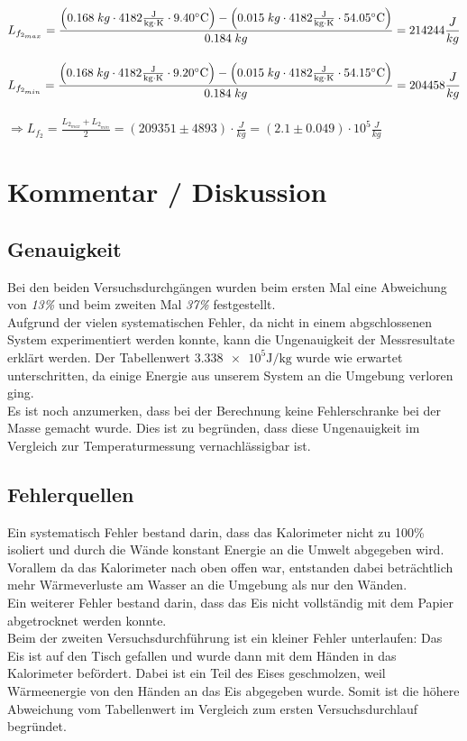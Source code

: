 \documentclass[a4paper,12pt]{article}
\begin{document}
$L_{f_{2_{max}}} =\displaystyle{\frac{\left(0.168\;kg \cdot 4182\rm{\frac{J}{kg \cdot K}}\cdot 9.40^{\circ}C \right)-\left(0.015\;kg\cdot 4182 \rm{\frac{J}{kg \cdot K}} \cdot 54.05^{\circ}C\right)}{0.184\;kg}} = 214244\frac{J}{kg}$\\\\

$L_{f_{2_{min}}} =\displaystyle{\frac{\left(0.168\;kg \cdot 4182\rm{\frac{J}{kg \cdot K}}\cdot 9.20^{\circ}C \right)-\left(0.015\;kg\cdot 4182 \rm{\frac{J}{kg \cdot K}} \cdot 54.15^{\circ}C\right)}{0.184\;kg}} = 204458\frac{J}{kg}$\\\\

$\Rightarrow L_{f_2}=\displaystyle{\frac{L_{2_{max}}+L_{2_{min}}}{2}=\left(209351\pm 4893\right) \cdot \frac{J}{kg}=\left(2.1\pm 0.049\right)\cdot 10^{5} \frac{J}{kg}}$

\newpage
\section{Kommentar / Diskussion}

\subsection{Genauigkeit}
Bei den beiden Versuchsdurchgängen wurden beim ersten Mal eine Abweichung von \textit{13\%} und beim zweiten Mal \textit{37\%} festgestellt.\\

Aufgrund der vielen systematischen Fehler, da nicht in einem abgschlossenen System experimentiert werden konnte, kann die Ungenauigkeit der Messresultate erklärt werden. Der Tabellenwert $ \num{3.338 e5}\si{\J\per\kg} $ wurde wie erwartet unterschritten, da einige Energie aus unserem System an die Umgebung verloren ging.\\

Es ist noch anzumerken, dass bei der Berechnung keine Fehlerschranke bei der Masse gemacht wurde. Dies ist zu begründen, dass diese Ungenauigkeit im Vergleich zur Temperaturmessung vernachlässigbar ist.

\subsection{Fehlerquellen}

Ein systematisch Fehler bestand darin, dass das Kalorimeter nicht zu 100\% isoliert und durch die Wände konstant Energie an die Umwelt abgegeben wird. Vorallem da das Kalorimeter nach oben offen war, entstanden dabei beträchtlich mehr Wärmeverluste am Wasser an die Umgebung als nur den Wänden.\\

Ein weiterer Fehler bestand darin, dass das Eis nicht vollständig mit dem Papier abgetrocknet werden konnte.\\

Beim der zweiten Versuchsdurchführung ist ein kleiner Fehler unterlaufen: Das Eis ist auf den Tisch gefallen und wurde dann mit dem Händen in das Kalorimeter befördert. Dabei ist ein Teil des Eises geschmolzen, weil Wärmeenergie von den Händen an das Eis abgegeben wurde. Somit ist die höhere Abweichung vom Tabellenwert im Vergleich zum ersten Versuchsdurchlauf begründet.
\end{document}
